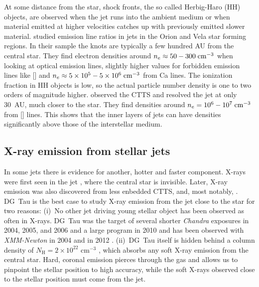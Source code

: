 \documentclass[manuscript]{aastex}
\begin{document}
At some distance from the star, shock fronts, the so called Herbig-Haro (HH) objects, are observed when the jet runs into the ambient medium or when material emitted at higher velocities catches up with previously emitted slower material. \citet{2006A&A...456..189P} studied emission line ratios in jets in the Orion and Vela star forming regions. In their sample the knots are typically a few hundred AU from the central star. They find electron densities around $n_e \approx 50-300 \textrm{\;cm}^{-3}$ when looking at optical emission lines, slightly higher values for forbidden emission lines like [] and $n_e \approx 5\times10^5-5\times10^6 \textrm{\;cm}^{-3}$ from Ca lines. The ionization fraction in HH objects is low, so the actual particle number density is one to two orders of magnitude higher. \citet{2004ApJ...609..261H} observed the CTTS  and resolved the jet at only 30~AU, much closer to the star. They find densities around $n_e=10^6-10^7\textrm{\;cm}^{-3}$ from [] lines. This shows that the inner layers of jets can have densities significantly above those of the interstellar medium.

\subsection{X-ray emission from stellar jets}
\label{sect:introxray}
In some jets there is evidence for another, hotter and faster component. X-rays were first seen in the jet  \citep{2001Natur.413..708P,2012A&A...542A.123S}, where the central star is invisible. Later, X-ray emission was also discovered from less enbedded CTTS,  \citep{2014ApJ...788..101S} and, most notably, . DG~Tau is the best case to study X-ray emission from the jet close to the star for two reasons: (i)~No other jet driving young stellar object has been observed as often in X-rays. DG~Tau was the target of several shorter \emph{Chandra} exposures in 2004, 2005, and 2006 and a large program in 2010 \citep{2005ApJ...626L..53G,2008A&A...478..797G,2011ASPC..448..617G} and has been observed with \emph{XMM-Newton} in 2004 \citep{2007A&A...468..353G} and in 2012 \citep{SchneiderDGTauXray}. (ii)~DG~Tau itself is hidden behind a column density of $N_{\textrm{H}}=2\times10^{22}\textrm{ cm}^{-3}$ \citep{2008A&A...478..797G}, which absorbs any soft X-ray emission from the central star. Hard, coronal emission pierces through the gas and allows us to pinpoint the stellar position to high accuracy, while the soft X-rays observed close to the stellar position must come from the jet.
\end{document}
